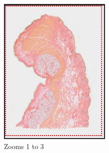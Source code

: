 \documentclass[a4paper,11pt]{report}
\numberwithin{figure}{section} %
\begin{document}
\begin{itemize}
         \begin{figure}[H]
            \centering
            \begin{subfigure}[b]{0.3\textwidth}
            \includegraphics[width=\textwidth]{images/zooms1.png}
            \caption{Zooms 1 to 3}
            \end{subfigure}
            \begin{subfigure}[b]{0.3\textwidth}

\end{subfigure}
\end{figure}
\end{itemize}
\end{document}
